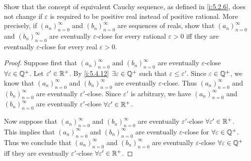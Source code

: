 \begin{ex}\label{i:ex:6.1.10}
  Show that the concept of equivalent Cauchy sequence, as defined in \cref{i:5.2.6}, does not change if \(\varepsilon\) is required to be positive real instead of positive rational.
  More precisely, if \((a_n)_{n = 0}^\infty\) and \((b_n)_{n = 0}^\infty\) are sequences of reals, show that \((a_n)_{n = 0}^\infty\) and \((b_n)_{n = 0}^\infty\) are eventually \(\varepsilon\)-close for every rational \(\varepsilon > 0\) iff they are eventually \(\varepsilon\)-close for every real \(\varepsilon > 0\).
\end{ex}

\begin{proof}
  Suppose first that \((a_n)_{n = 0}^\infty\) and \((b_n)_{n = 0}^\infty\) are eventually \(\varepsilon\)-close \(\forall \varepsilon \in \mathbb{Q}^+\).
  Let \(\varepsilon' \in \mathbb{R}^+\).
  By \cref{i:5.4.12} \(\exists \varepsilon \in \mathbb{Q}^+\) such that \(\varepsilon \leq \varepsilon'\).
  Since \(\varepsilon \in \mathbb{Q}^+\), we know that \((a_n)_{n = 0}^\infty\) and \((b_n)_{n = 0}^\infty\) are eventually \(\varepsilon\)-close.
  Thus \((a_n)_{n = 0}^\infty\) and \((b_n)_{n = 0}^\infty\) are eventually \(\varepsilon'\)-close.
  Since \(\varepsilon'\) is arbitrary, we have \((a_n)_{n = 0}^\infty\) and \((b_n)_{n = 0}^\infty\) are eventually \(\varepsilon'\)-close \(\forall \varepsilon' \in \mathbb{R}^+\).

  Now suppose that \((a_n)_{n = 0}^\infty\) and \((b_n)_{n = 0}^\infty\) are eventually \(\varepsilon'\)-close \(\forall \varepsilon' \in \mathbb{R}^+\).
  This implies that \((a_n)_{n = 0}^\infty\) and \((b_n)_{n = 0}^\infty\) are eventually \(\varepsilon\)-close for \(\forall \varepsilon \in \mathbb{Q}^+\).
  Thus we conclude that \((a_n)_{n = 0}^\infty\) and \((b_n)_{n = 0}^\infty\) are eventually \(\varepsilon\)-close \(\forall \varepsilon \in \mathbb{Q}^+\) iff they are eventually \(\varepsilon'\)-close \(\forall \varepsilon' \in \mathbb{R}^+\).
\end{proof}
